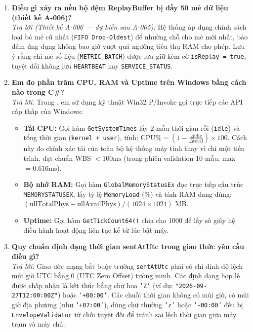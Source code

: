 \documentclass[12pt,a4paper]{article}
\begin{document}
\begin{enumerate}[leftmargin=*, label=\textbf{Câu \arabic*:}]
    \textit{Trả lời (Thiết kế A-006 — dự kiến sau A-005):} Sử dụng cơ chế hàng đợi FIFO (First-In, First-Out), gửi từ bản ghi cũ nhất đến bản ghi mới nhất nhằm bảo đảm trình tự dòng thời gian trong cơ sở dữ liệu.
  \item \textbf{Điều gì xảy ra nếu bộ đệm ReplayBuffer bị đầy 50 mẻ dữ liệu (thiết kế A-006)?} \\
    \textit{Trả lời (Thiết kế A-006 — dự kiến sau A-005):} Hệ thống áp dụng chính sách loại bỏ mẻ cũ nhất (\texttt{FIFO Drop-Oldest}) để nhường chỗ cho mẻ mới nhất, bảo đảm ứng dụng không bao giờ vượt quá ngưỡng tiêu thụ RAM cho phép. Lưu ý rằng chỉ mẻ số liệu (\texttt{METRIC\_BATCH}) được lưu giữ kèm cờ \texttt{isReplay = true}, tuyệt đối không lưu \texttt{HEARTBEAT} hay \texttt{SERVICE\_STATUS}.
  \item \textbf{Em đo phần trăm CPU, RAM và Uptime trên Windows bằng cách nào trong C\#?} \\
    \textit{Trả lời:} Trong , em sử dụng kỹ thuật Win32 P/Invoke gọi trực tiếp các API cấp thấp của Windows:
    \begin{itemize}
      \item \textbf{Tải CPU:} Gọi hàm \texttt{GetSystemTimes} lấy 2 mẫu thời gian rỗi (\texttt{idle}) và tổng thời gian (\texttt{kernel + user}), tính: $\text{CPU\%} = (1 - \frac{\Delta\text{idle}}{\Delta\text{total}}) \times 100$. Cách này đo chính xác tải của toàn bộ hệ thống máy tính thay vì chỉ một tiến trình, đạt chuẩn WBS $< 100\text{ms}$ (trong phiên validation 10 mẫu, max $= 0.616\text{ms}$).
      \item \textbf{Bộ nhớ RAM:} Gọi hàm \texttt{GlobalMemoryStatusEx} đọc trực tiếp cấu trúc \texttt{MEMORYSTATUSEX}, lấy tỷ lệ \texttt{MemoryLoad} (\%) và tính RAM đang dùng: $(\text{ullTotalPhys} - \text{ullAvailPhys}) / (1024 \times 1024)$ MB.
      \item \textbf{Uptime:} Gọi hàm \texttt{GetTickCount64()} chia cho 1000 để lấy số giây hệ điều hành hoạt động liên tục kể từ lúc bật máy.
    \end{itemize}
  \item \textbf{Quy chuẩn định dạng thời gian sentAtUtc trong giao thức yêu cầu điều gì?} \\
    \textit{Trả lời:} Giao ước mạng bắt buộc trường \texttt{sentAtUtc} phải có chỉ định độ lệch múi giờ UTC bằng 0 (UTC Zero Offset) tường minh. Các định dạng hợp lệ được chấp nhận là kết thúc bằng chữ hoa \texttt{'Z'} (ví dụ: \texttt{"2026-09-27T12:00:00Z"}) hoặc \texttt{'+00:00'}. Các chuỗi thời gian không có múi giờ, có múi giờ địa phương (như \texttt{'+07:00'}), dùng chữ thường \texttt{'z'} hoặc \texttt{'-00:00'} đều bị \texttt{EnvelopeValidator} từ chối tuyệt đối để tránh sai lệch thời gian giữa máy trạm và máy chủ.

\end{enumerate}
\end{document}
